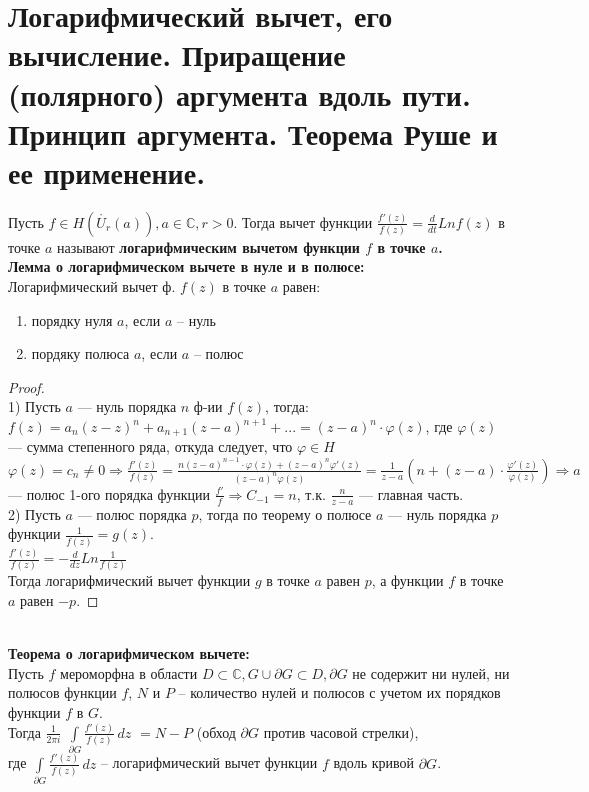 \newpage
\section{Логарифмический вычет, его вычисление. Приращение (полярного) аргумента вдоль пути. Принцип аргумента. Теорема Руше и ее применение.}

Пусть $f \in H(\mathring{U_r}(a)), a \in \mathbb{C}, r > 0$. Тогда вычет функции $\frac{f'(z)}{f(z)} = \frac{d}{dt}Lnf(z)$ в точке $a$ называют \textbf{логарифмическим вычетом функции $f$ в точке $a$.}\\[2mm]

\textbf{Лемма о логарифмическом вычете в нуле и в полюсе:}\\[2mm]
Логарифмический вычет ф. $f(z)$ в точке $a$ равен:
\begin{enumerate}
    \item порядку нуля $a$, если $a$ -- нуль
    \item пордяку полюса $a$, если $a$ -- полюс
\end{enumerate}

\begin{proof}
    \ \\
    1) Пусть $a$ --- нуль порядка $n$ ф-ии $f(z)$, тогда:\\
    $f(z) =a_n(z-z)^n + a_{n+1}(z-a)^{n+1}+...=(z-a)^n\cdot \varphi(z)$, где
    $\varphi(z)$ --- сумма степенного ряда, откуда следует, что $\varphi \in H$\\[2mm]
    $\varphi(z)=c_n\neq0\Rightarrow \frac{f'(z)}{f(z)}=\frac{n(z-a)^{n-1}\cdot \varphi(z)+(z-a)^{n}\varphi'(z)}{(z-a)^n \varphi(z)}=\frac{1}{z-a}(n+(z-a)\cdot \frac{\varphi'(z)}{\varphi(z)}) \Rightarrow a$ --- полюс 1-ого порядка функции $\frac{f'}{f} \Rightarrow C_{-1}=n$, т.к. $\frac{n}{z-a}$ --- главная часть.\\[2mm]
    2) Пусть $a$ --- полюс порядка $p$, тогда по теорему о полюсе $a$ --- нуль порядка $p$ функции $\frac{1}{f(z)}=g(z)$.\\
    $\frac{f'(z)}{f(z)} = -\frac{d}{dz} Ln\frac{1}{f(z)}$\\
    Тогда логарифмический вычет функции $g$ в точке $a$ равен $p$, а функции $f$ в точке $a$ равен $-p$.
\end{proof}
\ \\

\textbf{Теорема о логарифмическом вычете:}\\[2mm]
Пусть $f$ мероморфна в области $D \subset \mathbb{C}, G \cup \partial G \subset D, \partial G$ не содержит ни нулей, ни полюсов функции $f$, $N$ и $P$ -- количество нулей и полюсов с учетом их порядков функции $f$ в $G$.\\
Тогда $\frac{1}{2\pi i}$ \(\int\limits_{\partial G} \frac{f'(z)}{f(z)}\, dz\) $= N - P$ (обход $\partial G$ против часовой стрелки),\\
где \(\int\limits_{\partial G} \frac{f'(z)}{f(z)}\, dz\) -- логарифмический вычет функции $f$ вдоль кривой $\partial G$.

